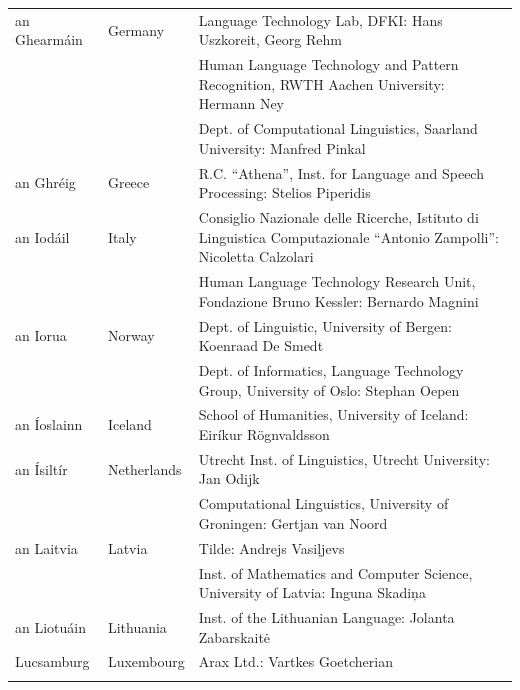 \begin{longtable}{@{}llp{113mm}@{}}
  an Ghearmáin  & \textcolor{grey1}{Germany} & Language Technology Lab, DFKI: Hans Uszkoreit, Georg Rehm\\ \addlinespace
  & & Human Language Technology and Pattern Recognition, RWTH Aachen University: Hermann Ney \\ \addlinespace
  & & Dept. of Computational Linguistics, Saarland University: Manfred Pinkal\\ \addlinespace
   
  an Ghréig & \textcolor{grey1}{Greece} & R.C. “Athena”, Inst. for Language and Speech Processing: Stelios Piperidis\\ \addlinespace
  
  an Iodáil & \textcolor{grey1}{Italy} & Consiglio Nazionale delle Ricerche, Istituto di Linguistica Computazionale “Antonio Zampolli”: Nicoletta Calzolari\\ \addlinespace
  & & Human Language Technology Research Unit, Fondazione Bruno Kessler: Bernardo Magnini\\ \addlinespace
 
  an Iorua & \textcolor{grey1}{Norway} & Dept. of Linguistic, University of Bergen: Koenraad De Smedt\\ \addlinespace 
  & & Dept. of Informatics, Language Technology Group, University of Oslo: \newline Stephan Oepen \\ \addlinespace
  
  an Íoslainn & \textcolor{grey1}{Iceland} & School of Humanities, University of Iceland: Eiríkur Rögnvaldsson\\ \addlinespace
  
  an Ísiltír & \textcolor{grey1}{Netherlands} & Utrecht Inst. of Linguistics, Utrecht University: Jan Odijk\\ \addlinespace 
  & & Computational Linguistics, University of Groningen: Gertjan van Noord\\ \addlinespace
   
  an Laitvia & \textcolor{grey1}{Latvia} & Tilde: Andrejs Vasiļjevs\\ \addlinespace 
  & & Inst. of Mathematics and Computer Science, University of Latvia: Inguna Skadiņa\\ \addlinespace
  
  an Liotuáin & \textcolor{grey1}{Lithuania} & Inst. of the Lithuanian Language: Jolanta Zabarskaitė\\ \addlinespace
  
  Lucsamburg & \textcolor{grey1}{Luxembourg} & Arax Ltd.: Vartkes Goetcherian\\ \addlinespace
  

\end{longtable}
